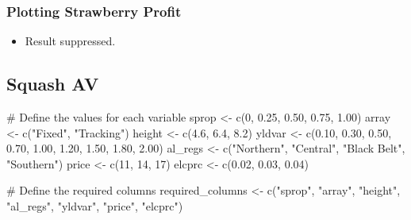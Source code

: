 \documentclass[
  letterpaper,
  DIV=11,
  numbers=noendperiod]{scrartcl}
\newenvironment{Shaded}{\begin{snugshade}}{\end{snugshade}}
\newcommand{\CommentTok}[1]{\textcolor[rgb]{0.37,0.37,0.37}{#1}}
\newcommand{\DecValTok}[1]{\textcolor[rgb]{0.68,0.00,0.00}{#1}}
\newcommand{\FloatTok}[1]{\textcolor[rgb]{0.68,0.00,0.00}{#1}}
\newcommand{\FunctionTok}[1]{\textcolor[rgb]{0.28,0.35,0.67}{#1}}
\newcommand{\NormalTok}[1]{\textcolor[rgb]{0.00,0.23,0.31}{#1}}
\newcommand{\OtherTok}[1]{\textcolor[rgb]{0.00,0.23,0.31}{#1}}
\newcommand{\StringTok}[1]{\textcolor[rgb]{0.13,0.47,0.30}{#1}}
\providecommand{\tightlist}{%
  \setlength{\itemsep}{0pt}\setlength{\parskip}{0pt}}\usepackage{longtable,booktabs,array}
\begin{document}
\subsubsection{Plotting Strawberry
Profit}\label{plotting-strawberry-profit}

\begin{itemize}
\tightlist
\item
  Result suppressed.
\end{itemize}

\subsection{Squash AV}\label{squash-av-1}

\begin{Shaded}
\begin{Highlighting}[]
\CommentTok{\# Define the values for each variable}
\NormalTok{sprop }\OtherTok{\textless{}{-}} \FunctionTok{c}\NormalTok{(}\DecValTok{0}\NormalTok{, }\FloatTok{0.25}\NormalTok{, }\FloatTok{0.50}\NormalTok{, }\FloatTok{0.75}\NormalTok{, }\FloatTok{1.00}\NormalTok{)}
\NormalTok{array }\OtherTok{\textless{}{-}} \FunctionTok{c}\NormalTok{(}\StringTok{"Fixed"}\NormalTok{, }\StringTok{"Tracking"}\NormalTok{)}
\NormalTok{height }\OtherTok{\textless{}{-}} \FunctionTok{c}\NormalTok{(}\FloatTok{4.6}\NormalTok{, }\FloatTok{6.4}\NormalTok{, }\FloatTok{8.2}\NormalTok{)}
\NormalTok{yldvar }\OtherTok{\textless{}{-}} \FunctionTok{c}\NormalTok{(}\FloatTok{0.10}\NormalTok{, }\FloatTok{0.30}\NormalTok{, }\FloatTok{0.50}\NormalTok{, }\FloatTok{0.70}\NormalTok{, }\FloatTok{1.00}\NormalTok{, }\FloatTok{1.20}\NormalTok{, }\FloatTok{1.50}\NormalTok{, }\FloatTok{1.80}\NormalTok{, }\FloatTok{2.00}\NormalTok{)}
\NormalTok{al\_regs }\OtherTok{\textless{}{-}} \FunctionTok{c}\NormalTok{(}\StringTok{"Northern"}\NormalTok{, }\StringTok{"Central"}\NormalTok{, }\StringTok{"Black Belt"}\NormalTok{, }\StringTok{"Southern"}\NormalTok{)}
\NormalTok{price }\OtherTok{\textless{}{-}} \FunctionTok{c}\NormalTok{(}\DecValTok{11}\NormalTok{, }\DecValTok{14}\NormalTok{, }\DecValTok{17}\NormalTok{)}
\NormalTok{elcprc }\OtherTok{\textless{}{-}} \FunctionTok{c}\NormalTok{(}\FloatTok{0.02}\NormalTok{, }\FloatTok{0.03}\NormalTok{, }\FloatTok{0.04}\NormalTok{)}

\CommentTok{\# Define the required columns}
\NormalTok{required\_columns }\OtherTok{\textless{}{-}} \FunctionTok{c}\NormalTok{(}\StringTok{"sprop"}\NormalTok{, }\StringTok{"array"}\NormalTok{, }\StringTok{"height"}\NormalTok{, }
                      \StringTok{"al\_regs"}\NormalTok{, }\StringTok{"yldvar"}\NormalTok{, }\StringTok{"price"}\NormalTok{, }\StringTok{"elcprc"}\NormalTok{)}


\end{Highlighting}
\end{Shaded}
\end{document}
